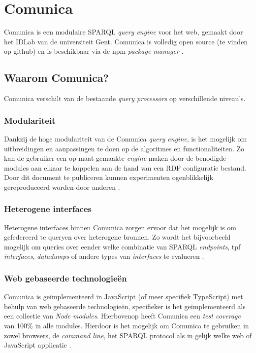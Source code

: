 \section{Comunica}
\label{sec:comunica}

Comunica is een modulaire SPARQL \textit{query engine} voor het web, gemaakt door het IDLab van de universiteit Gent. Comunica is volledig open source (te vinden op github) en is beschikbaar via de npm \textit{package manager} \cite{taelman2018comunica}.

\subsection{Waarom Comunica?}
Comunica verschilt van de bestaande \textit{query processors} op verschillende niveau's. 

\subsubsection{Modulariteit}
Dankzij de hoge modulariteit van de Comunica \textit{query engine}, is het mogelijk om uitbreidingen en aanpassingen te doen op de algoritmes en functionaliteiten. Zo kan de gebruiker een op maat gemaakte \textit{engine} maken door de benodigde modules aan elkaar te koppelen aan de hand van een RDF configuratie bestand. Door dit document te publiceren kunnen experimenten ogenblikkelijk gereproduceerd worden door anderen \cite{taelman2018comunica}.

\subsubsection{Heterogene interfaces}
Heterogene interfaces binnen Comunica zorgen ervoor dat het mogelijk is om gefedereerd te queryen over heterogene bronnen. Zo wordt het bijvoorbeeld mogelijk om queries over eender welke combinatie van SPARQL \textit{endpoints}, \acrshort{tpf} \textit{interfaces}, \textit{datadumps} of andere types van \textit{interfaces} te evalueren \cite{taelman2018comunica}.

\subsubsection{Web gebaseerde technologieën}
Comunica is geïmplementeerd in JavaScript (of meer specifiek TypeScript) met behulp van web gebaseerde technologieën, specifieker is het geïmplementeerd als een collectie van \textit{Node modules}. Hierbovenop heeft Comunica een \textit{test coverage} van 100\% in alle modules. Hierdoor is het mogelijk om Comunica te gebruiken in zowel browsers, de \textit{command line}, het SPARQL protocol als in gelijk welke web of JavaScript applicatie \cite{taelman2018comunica}.


